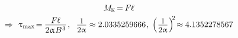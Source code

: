 \documentclass[14pt]{extarticle}
\begin{document}
\[\begin{gathered}
\\[-.3em]
%
M_{\hspace{-0.1ex}\mathrm{\scalebox{.6}{K}}} \hspace{-.25ex}
= \hspace{-.2ex} F \hspace{-0.1ex} \ell
\\[-.1em]
%
\Rightarrow\hspace{.4em}
\uptau_{\scalebox{.75}{max}} \hspace{-.3ex}
= \hspace{-.1ex} \displaystyle\frac{\raisebox{-0.18em}{$F \hspace{-0.1ex} \ell$}}{2 \upalpha \hspace{.1ex} B^{\hspace{.1ex}3}}
\hspace{.2ex} , \hspace{.6em}
%
\scalebox{.93}{$ \displaystyle\frac{\raisebox{-0.2em}{$1$}}{2 \upalpha} $}
\approx 2.0335259666
\hspace{.1ex} , \hspace{.4em}
\hspace{-.25ex}
\left( \hspace{.1ex} \scalebox{.93}{$ \displaystyle\frac{\raisebox{-0.2em}{$1$}}{2 \upalpha} $} \hspace{.15ex} \right)^{\hspace{-.5ex}2} \hspace{-.4ex}
\approx 4.1352278567
\end{gathered}\]
\end{document}
